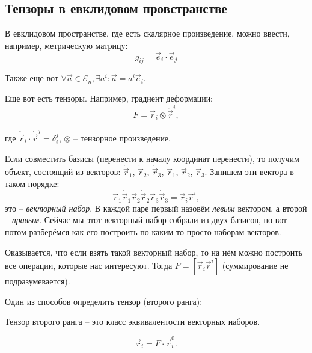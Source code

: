 \subsection{Тензоры в евклидовом провстранстве}

В евклидовом пространстве, где есть скалярное произведение, можно ввести, например, метрическую
матрицу:
\[
  g_{ij} = \vec{e}_i \cdot \vec{e}_j
\]

Также еще вот $\forall \vec{a} \in \mathcal{E}_n, \exists a^i :  \vec{a} = a^i \vec{e}_i$.

Еще вот есть тензоры. Например, градиент деформации:
\[
  F = \vec{r}_i \otimes \mathring{\vec{r}}^i,
\]

\begin{figure}[H]
	\centering
	
\end{figure}
где $\mathring{\vec{r}}_i \cdot \mathring{\vec{r}}^j = \delta_i^j$,
  $\otimes$ -- тензорное произведение.

Если совместить базисы (перенести к началу координат перенести), то получим объект, состоящий
из векторов: $\mathring{\vec{r}}_1$, $\mathring{\vec{r}}_2$, $\mathring{\vec{r}}_3$, $\vec{r}_1$,
$\vec{r}_2$, $\vec{r}_3$. Запишем эти вектора в таком порядке:
\[
  \vec{r}_1 \mathring{\vec{r}}_1 \vec{r}_2 \mathring{\vec{r}}_2 \vec{r}_3 \mathring{\vec{r}}_3 = \vec{r}_i \vec{r}^i,
\]
это -- \emph{векторный набор}. В каждой паре первый назовём \emph{левым} вектором, а
второй -- \emph{правым}. Сейчас мы этот векторный набор собрали из двух базисов, но вот потом
разберёмся как его построить по каким-то просто наборам векторов. 

\begin{figure}[H]
	\centering
	
\end{figure}

Оказывается, что если взять такой векторный набор, то на нём можно построить все операции, которые
нас интересуют. Тогда $F = [\vec{r}_i \vec{r}^i]$ (суммирование не подразумевается).

Один из способов определить тензор (второго ранга):
\begin{definition}
  Тензор второго ранга -- это класс эквивалентости векторных наборов.
\end{definition}

\[
  \vec{r}_i = F \cdot \vec{r}_i^0.
\]

\begin{figure}[H]
	\centering
	
\end{figure}

